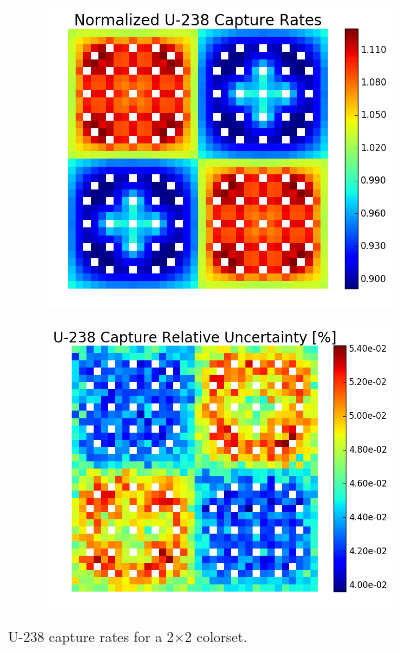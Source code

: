 \begin{figure}[h!]
\centering
\begin{subfigure}{0.44\textwidth}
  \centering
  \includegraphics[width=\linewidth]{figures/benchmarks/capture-rates/capt-mean-2x2}
  \caption{}
  \label{fig:chap7-capt-rate-mean-2x2}
\end{subfigure}%
\begin{subfigure}{0.44\textwidth}
  \centering
  \includegraphics[width=\linewidth]{figures/benchmarks/capture-rates/capt-rel-err-2x2}
  \caption{}
  \label{fig:chap7-capt-rate-rel-err-2x2}
\end{subfigure}%
\caption[U-238 capture rates for a 2$\times$2 colorset]{U-238 capture rates for a 2$\times$2 colorset.}
\label{fig:chap7-capt-rates-2x2}
\end{figure}


